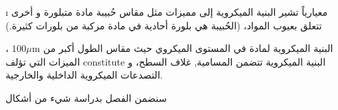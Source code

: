 \begin {corrige}[\thechapter ]{\i }
 معيارياً تشير البنية الميكروية إلى مميزات مثل مقاس حُبيبة مادة متبلورة و أخرى تتعلق بعيوب المواد، (الحُبيبة هي بلورة أحادية في مادة مركبة من بلورات كثيرة.)

البنية الميكروية لمادة في المستوى الميكروي حيث مقاس الطول أكبر من 
$100\mu\mathrm{m}$
، الميزات التي تؤلف constitute البنية الميكروية تتضمن المسامية, غلاف السطح، و التصدعات الميكروية الداخلية والخارجية.

سنضمن الفصل بدراسة شيء من أشكال  
\end {corrige}\par \vspace *{\spacebeforeexo }
